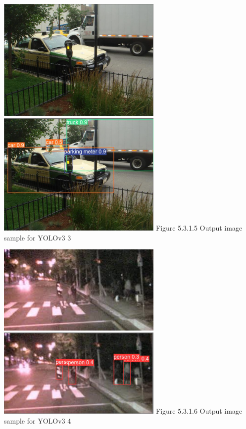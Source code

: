 \documentclass[runningheads,a4paper,11pt]{report}
\begin{document}
\begin{center}
\includegraphics[width=8cm]{images/image3.png}   
\includegraphics[width=8cm]{images/image3_label.PNG}
Figure 5.3.1.5 Output image sample for YOLOv3 3
\end{center}
\begin{center}
\includegraphics[width=8cm]{images/image4.jpg}   
\includegraphics[width=8cm]{images/image4_label.PNG}
Figure 5.3.1.6 Output image sample for YOLOv3 4
\end{center}
\end{document}
